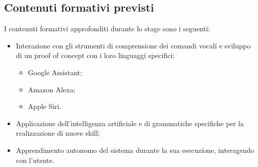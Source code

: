\subsection{Contenuti formativi previsti}
I contenuti formativi approfonditi durante lo stage sono i seguenti:
\begin{itemize}
	\item Interazione con gli strumenti di comprensione dei comandi vocali e sviluppo di un proof of concept con i loro linguaggi specifici:
		\begin{itemize}
			\item Google Assistant;
			\item Amazon Alexa;
			\item Apple Siri.
		\end{itemize}
	\item Applicazione dell'intelligenza artificiale e di grammatiche specifiche per la realizzazione di nuove skill;
	\item Apprendimento autonomo del sistema durante la sua esecuzione, interagendo con l'utente. 
\end{itemize}
